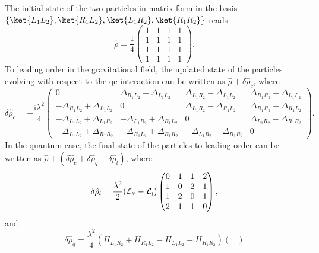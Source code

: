\documentclass[letterpaper,12pt,titlepage,oneside,final]{book}
\newcommand{\ii}{\mathrm{i}}
\begin{document}
{The initial state of the two particles in matrix form in the basis $\{\ket{L_1L_2},\ket{R_1 L_2},\ket{L_1R_2},\ket{R_1R_2}\}$ reads
\begin{equation}
    \hat{\rho} = \frac{1}{4}
    \begin{pmatrix}
        1 & 1 & 1 & 1\\
        1 & 1 & 1 & 1\\
        1 & 1 & 1 & 1\\
        1 & 1 & 1 & 1        
    \end{pmatrix}.
\end{equation}
To leading order in the gravitational field, the updated state of the particles evolving with respect to the qc-interaction can be written as $\hat{\rho} +  \delta\hat{\rho}_c$, where
\begin{equation}
    \delta\hat{\rho}_c = -\frac{\ii \lambda^2}{4}
    \begin{pmatrix}
        0 & \Delta_{R_1L_2}-\Delta_{L_1L_2} &\Delta_{L_1R_2}-\Delta_{L_1L_2} & \Delta_{R_1R_2}-\Delta_{L_1L_2}\\
        -\Delta_{R_1L_2}+\Delta_{L_1L_2} & 0 & \Delta_{L_1R_2}-\Delta_{R_1L_2} & \Delta_{R_1R_2}-\Delta_{R_1L_2}\\
       -\Delta_{L_1L_2}+\Delta_{L_1R_2} & -\Delta_{L_1R_2}+\Delta_{R_1L_2} & 0 & \Delta_{L_1R_2}-\Delta_{R_1R_2}\\
        -\Delta_{L_1L_2}+\Delta_{R_1R_2} & -\Delta_{R_1L_2}+\Delta_{R_1R_2} & -\Delta_{L_1R_2}+\Delta_{R_1R_2} & 0      
    \end{pmatrix}.
\end{equation}
In the quantum case, the final state of the particles to leading order can be written as $\hat{\rho} + (\delta\hat{\rho}_c+\delta\hat{\rho}_q+\delta \hat{\rho}_l)$, where
\begin{equation}
    \delta\hat{\rho}_l = \frac{\lambda^2}{2} (\mathcal{L}_\textsc{v}-\mathcal{L}_{\textsc{i}})
    \begin{pmatrix}
        0  &  1 & 1 & 2\\
        1  &  0 & 2 & 1\\
        1  &  2 & 0 & 1\\
        2  &  1 & 1 & 0
    \end{pmatrix},
\end{equation}
and
\begin{equation}
    \delta\hat{\rho}_q = \frac{\lambda^2}{4}(H_{L_1R_2} \!\!+ \!\!H_{R_1L_2} \!\!-\!\! H_{L_1L_2}\!\!-\!\!H_{R_1R_2})
    \begin{pmatrix}

\end{pmatrix}
\end{equation}}
\end{document}
